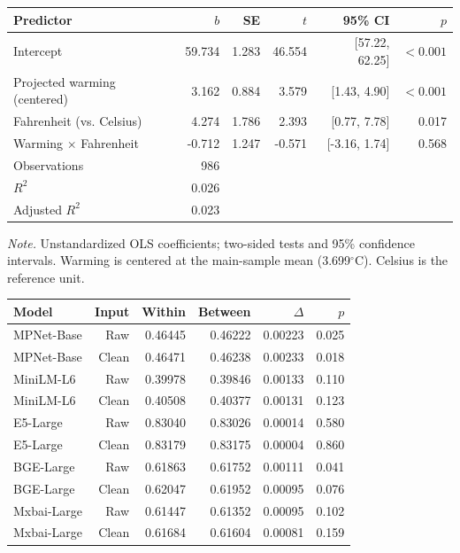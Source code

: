 \documentclass[11pt,a4paper]{article}
\begin{document}
\begingroup\small
\begin{tabularx}{\textwidth}{@{}Xrrrrr@{}}
\toprule
Predictor & $b$ & SE & $t$ & 95\% CI & $p$ \\
\midrule
Intercept & 59.734 & 1.283 & 46.554 & [57.22, 62.25] & $<0.001$ \\
Projected warming (centered) & 3.162 & 0.884 & 3.579 & [1.43, 4.90] & $<0.001$ \\
Fahrenheit (vs. Celsius) & 4.274 & 1.786 & 2.393 & [0.77, 7.78] & 0.017 \\
Warming $\times$ Fahrenheit & -0.712 & 1.247 & -0.571 & [-3.16, 1.74] & 0.568 \\
Observations & 986 &  &  &  &  \\
$R^2$ & 0.026 &  &  &  &  \\
Adjusted $R^2$ & 0.023 &  &  &  &  \\
\bottomrule\end{tabularx}
\par\smallskip
{\footnotesize\textit{Note.} Unstandardized OLS coefficients; two-sided tests and 95\% confidence intervals. Warming is centered at the main-sample mean (3.699$^\circ$C). Celsius is the reference unit.\par}
\endgroup\bigskip
{}\label{tab:4}
\begingroup\small
\begin{tabularx}{\textwidth}{@{}Xrrrrr@{}}
\toprule
Model & Input & Within & Between & $\Delta$ & $p$ \\
\midrule
MPNet-Base & Raw & 0.46445 & 0.46222 & 0.00223 & 0.025 \\
MPNet-Base & Clean & 0.46471 & 0.46238 & 0.00233 & 0.018 \\
MiniLM-L6 & Raw & 0.39978 & 0.39846 & 0.00133 & 0.110 \\
MiniLM-L6 & Clean & 0.40508 & 0.40377 & 0.00131 & 0.123 \\
E5-Large & Raw & 0.83040 & 0.83026 & 0.00014 & 0.580 \\
E5-Large & Clean & 0.83179 & 0.83175 & 0.00004 & 0.860 \\
BGE-Large & Raw & 0.61863 & 0.61752 & 0.00111 & 0.041 \\
BGE-Large & Clean & 0.62047 & 0.61952 & 0.00095 & 0.076 \\
Mxbai-Large & Raw & 0.61447 & 0.61352 & 0.00095 & 0.102 \\
Mxbai-Large & Clean & 0.61684 & 0.61604 & 0.00081 & 0.159 \\
\bottomrule\end{tabularx}
\end{document}
